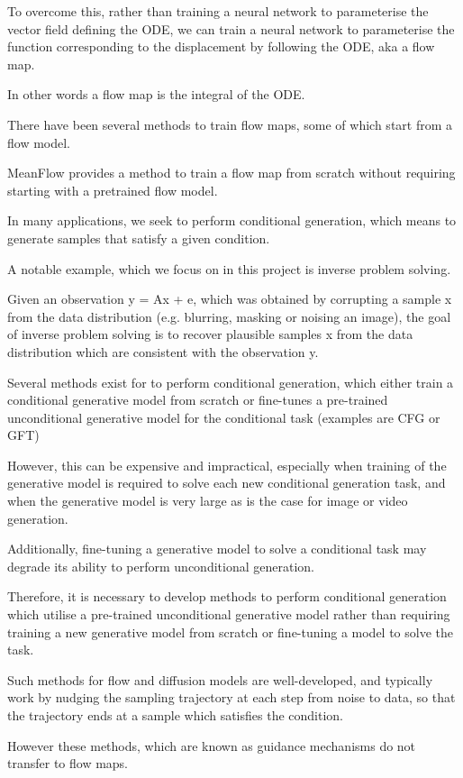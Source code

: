 \documentclass[12pt,a4paper]{report}
\begin{document}
To overcome this, rather than training a neural network to parameterise the vector field defining the ODE, we can train a neural network to parameterise the function corresponding to the displacement by following the ODE, aka a flow map. 

In other words a flow map is the integral of the ODE. 

There have been several methods to train flow maps, some of which start from a flow model. 

MeanFlow provides a method to train a flow map from scratch without requiring starting with a pretrained flow model. 

In many applications, we seek to perform conditional generation, which means to generate samples that satisfy a given condition. 

A notable example, which we focus on in this project is inverse problem solving. 

Given an observation y = Ax + e, which was obtained by corrupting a sample x from the data distribution (e.g. blurring, masking or noising an image), the goal of inverse problem solving is to recover plausible samples x from the data distribution which are consistent with the observation y. 

Several methods exist for to perform conditional generation, which either train a conditional generative model from scratch or fine-tunes a pre-trained unconditional generative model for the conditional task (examples are CFG or GFT)

However, this can be expensive and impractical, especially when training of the generative model is required to solve each new conditional generation task, and when the generative model is very large as is the case for image or video generation. 

Additionally, fine-tuning a generative model to solve a conditional task may degrade its ability to perform unconditional generation. 

Therefore, it is necessary to develop methods to perform conditional generation which utilise a pre-trained unconditional generative model rather than requiring training a new generative model from scratch or fine-tuning a model to solve the task. 

Such methods for flow and diffusion models are well-developed, and typically work by nudging the sampling trajectory at each step from noise to data, so that the trajectory ends at a sample which satisfies the condition. 

However these methods, which are known as guidance mechanisms do not transfer to flow maps. 
\end{document}
